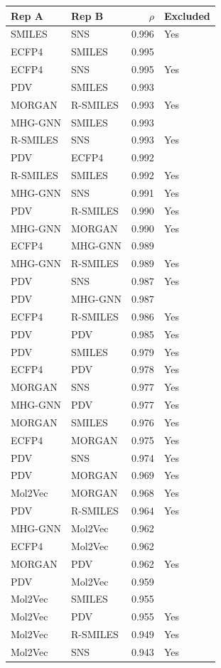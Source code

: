\begin{tabular}{llrl}
\toprule
\textbf{Rep A} & \textbf{Rep B} & \textbf{$\rho$} & \textbf{Excluded} \\
\midrule
SMILES & SNS & 0.996 & Yes \\
ECFP4 & SMILES & 0.995 &  \\
ECFP4 & SNS & 0.995 & Yes \\
PDV & SMILES & 0.993 &  \\
MORGAN & R-SMILES & 0.993 & Yes \\
MHG-GNN & SMILES & 0.993 &  \\
R-SMILES & SNS & 0.993 & Yes \\
PDV & ECFP4 & 0.992 &  \\
R-SMILES & SMILES & 0.992 & Yes \\
MHG-GNN & SNS & 0.991 & Yes \\
PDV & R-SMILES & 0.990 & Yes \\
MHG-GNN & MORGAN & 0.990 & Yes \\
ECFP4 & MHG-GNN & 0.989 &  \\
MHG-GNN & R-SMILES & 0.989 & Yes \\
PDV & SNS & 0.987 & Yes \\
PDV & MHG-GNN & 0.987 &  \\
ECFP4 & R-SMILES & 0.986 & Yes \\
PDV & PDV & 0.985 & Yes \\
PDV & SMILES & 0.979 & Yes \\
ECFP4 & PDV & 0.978 & Yes \\
MORGAN & SNS & 0.977 & Yes \\
MHG-GNN & PDV & 0.977 & Yes \\
MORGAN & SMILES & 0.976 & Yes \\
ECFP4 & MORGAN & 0.975 & Yes \\
PDV & SNS & 0.974 & Yes \\
PDV & MORGAN & 0.969 & Yes \\
Mol2Vec & MORGAN & 0.968 & Yes \\
PDV & R-SMILES & 0.964 & Yes \\
MHG-GNN & Mol2Vec & 0.962 &  \\
ECFP4 & Mol2Vec & 0.962 &  \\
MORGAN & PDV & 0.962 & Yes \\
PDV & Mol2Vec & 0.959 &  \\
Mol2Vec & SMILES & 0.955 &  \\
Mol2Vec & PDV & 0.955 & Yes \\
Mol2Vec & R-SMILES & 0.949 & Yes \\
Mol2Vec & SNS & 0.943 & Yes \\
\bottomrule
\end{tabular}